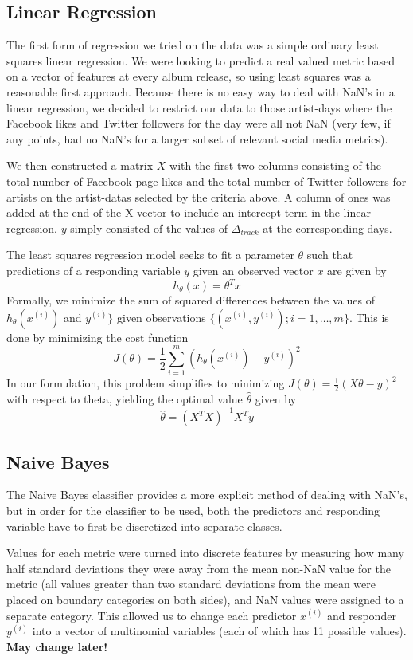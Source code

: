 \documentclass[conference]{IEEEtran}
\begin{document}
\subsection{Linear Regression}
The first form of regression we tried on the data was a simple ordinary least squares linear regression. We were looking to predict a real valued metric based on a vector of features at every album release, so using least squares was a reasonable first approach. Because there is no easy way to deal with NaN's in a linear regression, we decided to restrict our data to those artist-days where the Facebook likes and Twitter followers for the day were all not NaN (very few, if any points, had no NaN's for a larger subset of relevant social media metrics).

We then constructed a matrix $X$ with the first two columns consisting of the total number of Facebook page likes and the total number of Twitter followers for artists on the artist-datas selected by the criteria above. A column of ones was added at the end of the X vector to include an intercept term in the linear regression. $y$ simply consisted of the values of $\Delta_{track}$ at the corresponding days.

The least squares regression model seeks to fit a parameter $\theta$ such that predictions of a responding variable $y$ given an observed vector $x$ are given by
$$h_\theta(x) = \theta^T x$$
Formally, we minimize the sum of squared differences between the values of $h_\theta(x^{(i)})$ and $y^{(i)}\}$ given observations $\{(x^{(i)}, y^{(i)}); i = 1,\dots,m\}$. This is done by minimizing the cost function
$$J(\theta) = \frac{1}{2}\sum_{i=1}^{m}(h_\theta(x^{(i)}) - y^{(i)})^2$$
In our formulation, this problem simplifies to minimizing $J(\theta) = \frac{1}{2} (X\theta - y)^2$ with respect to theta, yielding the optimal value $\hat{\theta}$ given by
$$\hat{\theta} = (X^T X)^{-1} X^T y$$

\subsection{Naive Bayes}
The Naive Bayes classifier provides a more explicit method of dealing with NaN's, but in order for the classifier to be used, both the predictors and responding variable have to first be discretized into separate classes.

Values for each metric were turned into discrete features by measuring how many half standard deviations they were away from the mean non-NaN value for the metric (all values greater than two standard deviations from the mean were placed on boundary categories on both sides), and NaN values were assigned to a separate category. This allowed us to change each predictor $x^{(i)}$ and responder $y^{(i)}$ into a vector of multinomial variables (each of which has 11 possible values). \textbf{May change later!}
\end{document}
